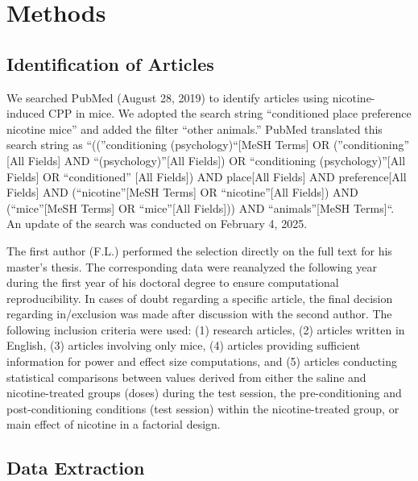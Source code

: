 \documentclass[authordate, meta, issue]{jote-new-article}
\begin{document}
	\section{Methods}



	\subsection{Identification of Articles}



	We searched PubMed (August 28, 2019) to identify articles using nicotine-induced CPP in mice. We adopted the search string “conditioned place preference nicotine mice” and added the filter “other animals.” PubMed translated this search string as “((”conditioning (psychology)“[MeSH Terms] OR (”conditioning” [All Fields] AND “(psychology)”[All Fields]) OR “conditioning (psychology)”[All Fields] OR “conditioned” [All Fields]) AND place[All Fields] AND preference[All Fields] AND (“nicotine”[MeSH Terms] OR “nicotine”[All Fields]) AND (“mice”[MeSH Terms] OR “mice”[All Fields])) AND “animals”[MeSH Terms]“. An update of the search was conducted on February 4, 2025.



	The first author (F.L.) performed the selection directly on the full text for his master's thesis. The corresponding data were reanalyzed the following year during the first year of his doctoral degree to ensure computational reproducibility. In cases of doubt regarding a specific article, the final decision regarding in/exclusion was made after discussion with the second author. The following inclusion criteria were used: (1) research articles, (2) articles written in English, (3) articles involving only mice, (4) articles providing sufficient information for power and effect size computations, and (5) articles conducting statistical comparisons between values derived from either the saline and nicotine-treated groups (doses) during the test session, the pre-conditioning and post-conditioning conditions (test session) within the nicotine-treated group, or main effect of nicotine in a factorial design.



	\subsection{Data Extraction}
\end{document}
